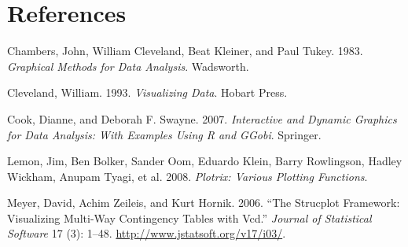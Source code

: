 \begin{Shaded}
\begin{Highlighting}[]
\end{Highlighting}
\end{Shaded}

\section*{References}\label{references}

\hypertarget{refs}{}
\hypertarget{ref-chambers:1983}{}
Chambers, John, William Cleveland, Beat Kleiner, and Paul Tukey. 1983.
\emph{Graphical Methods for Data Analysis}. Wadsworth.

\hypertarget{ref-cleveland:1993}{}
Cleveland, William. 1993. \emph{Visualizing Data}. Hobart Press.

\hypertarget{ref-cook:2007}{}
Cook, Dianne, and Deborah F. Swayne. 2007. \emph{Interactive and Dynamic
Graphics for Data Analysis: With Examples Using R and GGobi}. Springer.

\hypertarget{ref-plotrix}{}
Lemon, Jim, Ben Bolker, Sander Oom, Eduardo Klein, Barry Rowlingson,
Hadley Wickham, Anupam Tyagi, et al. 2008. \emph{Plotrix: Various
Plotting Functions}.

\hypertarget{ref-meyer:2006}{}
Meyer, David, Achim Zeileis, and Kurt Hornik. 2006. ``The Strucplot
Framework: Visualizing Multi-Way Contingency Tables with Vcd.''
\emph{Journal of Statistical Software} 17 (3): 1--48.
\url{http://www.jstatsoft.org/v17/i03/}.

